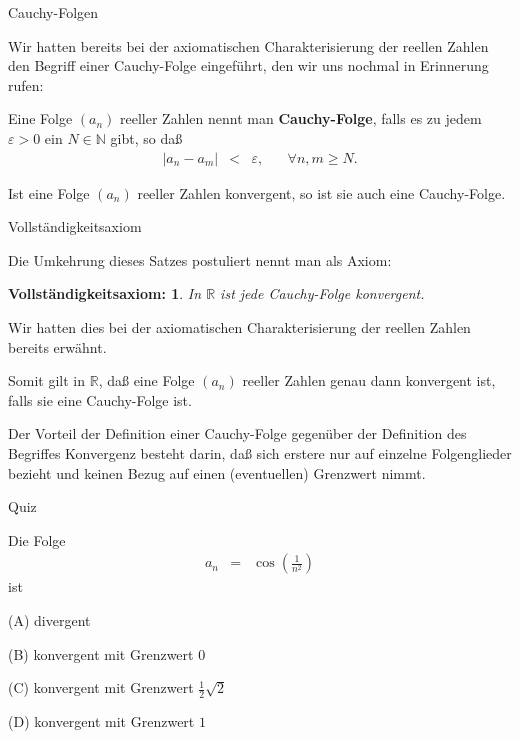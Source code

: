 \documentclass[german]{beamer}
\newcommand{\bq}{\begin{eqnarray*}}
\newcommand{\eq}{\end{eqnarray*}}
\newcommand{\eps}{\varepsilon}
\newtheorem*{mytheorem18}{Vollst\"andigkeitsaxiom:}
\begin{document}
\begin{frame}{Cauchy-Folgen}

Wir hatten bereits bei der axiomatischen Charakterisierung der reellen Zahlen
den Begriff einer Cauchy-Folge eingef\"uhrt, den wir uns nochmal in Erinnerung rufen:
\begin{definition}
Eine Folge $(a_n)$ reeller Zahlen nennt man {\bf Cauchy-Folge}, falls es zu jedem $\eps > 0$ 
ein $N \in {\mathbb N}$ gibt, so da{\ss}
\bq
 \left| a_n - a_m \right| & < & \eps,
 \;\;\;\;\;\;
 \forall n,m \ge N.
\eq
\end{definition}
\begin{theorem}
Ist eine Folge $(a_n)$ reeller Zahlen konvergent, so ist sie auch eine Cauchy-Folge.
\end{theorem}

\end{frame}

\begin{frame}{Vollst\"andigkeitsaxiom}

Die Umkehrung dieses Satzes postuliert nennt man als Axiom:
\begin{mytheorem18}
In ${\mathbb R}$ ist jede Cauchy-Folge konvergent.
\end{mytheorem18}

Wir hatten dies bei der axiomatischen Charakterisierung der reellen Zahlen bereits erw\"ahnt.

Somit gilt in ${\mathbb R}$, da{\ss} eine Folge $(a_n)$ reeller Zahlen genau dann konvergent ist,
falls sie eine Cauchy-Folge ist.

\vspace*{3mm}

Der Vorteil der Definition einer Cauchy-Folge gegen\"uber der Definition des Begriffes Konvergenz
besteht darin, da{\ss} sich erstere nur auf einzelne Folgenglieder bezieht und keinen
Bezug auf einen (eventuellen) Grenzwert nimmt.

\end{frame}

\begin{frame}{Quiz}

Die Folge
\bq
 a_n & = & \cos\left(\frac{1}{n^2}\right)
\eq
ist
\begin{description}
\item{(A)} divergent
\item{(B)} konvergent mit Grenzwert $0$
\item{(C)} konvergent mit Grenzwert $\frac{1}{2} \sqrt{2}$
\item{(D)} konvergent mit Grenzwert $1$
\end{description}

\end{frame}
\end{document}
